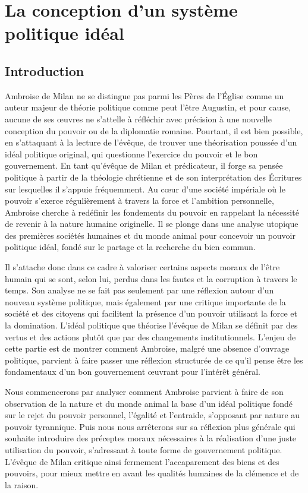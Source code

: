 \section{La conception d'un système politique idéal}

\subsection*{Introduction}

Ambroise de Milan ne se distingue pas parmi les Pères de l'Église comme un auteur majeur de théorie politique comme peut l'être Augustin, et pour cause, aucune de ses œuvres ne s'attelle à réfléchir avec précision à une nouvelle conception du pouvoir ou de la diplomatie romaine. Pourtant, il est bien possible, en s'attaquant à la lecture de l'évêque, de trouver une théorisation poussée d'un idéal politique original, qui questionne l'exercice du pouvoir et le bon gouvernement. En tant qu'évêque de Milan et prédicateur, il forge sa pensée politique à partir de la théologie chrétienne et de son interprétation des Écritures sur lesquelles il s'appuie fréquemment. Au cœur d'une société impériale où le pouvoir s'exerce régulièrement à travers la force et l'ambition personnelle, Ambroise cherche à redéfinir les fondements du pouvoir en rappelant la nécessité de revenir à la nature humaine originelle. Il se plonge dans une analyse utopique des premières sociétés humaines et du monde animal pour concevoir un pouvoir politique idéal, fondé sur le partage et la recherche du bien commun.

\bigskip

Il s'attache donc dans ce cadre à valoriser certains aspects moraux de l'être humain qui se sont, selon lui, perdus dans les fautes et la corruption à travers le temps. Son analyse ne se fait pas seulement par une réflexion autour d'un nouveau système politique, mais également par une critique importante de la société et des citoyens qui facilitent la présence d'un pouvoir utilisant la force et la domination. L'idéal politique que théorise l'évêque de Milan se définit par des vertus et des actions plutôt que par des changements institutionnels. L'enjeu de cette partie est de montrer comment Ambroise, malgré une absence d'ouvrage politique, parvient à faire passer une réflexion structurée de ce qu'il pense être les fondamentaux d'un bon gouvernement œuvrant pour l'intérêt général.

\bigskip

Nous commencerons par analyser comment Ambroise parvient à faire de son observation de la nature et du monde animal la base d'un idéal politique fondé sur le rejet du pouvoir personnel, l'égalité et l'entraide, s'opposant par nature au pouvoir tyrannique. Puis nous nous arrêterons sur sa réflexion plus générale qui souhaite introduire des préceptes moraux nécessaires à la réalisation d'une juste utilisation du pouvoir, s'adressant à toute forme de gouvernement politique. L'évêque de Milan critique ainsi fermement l'accaparement des biens et des pouvoirs, pour mieux mettre en avant les qualités humaines de la clémence et de la raison.

